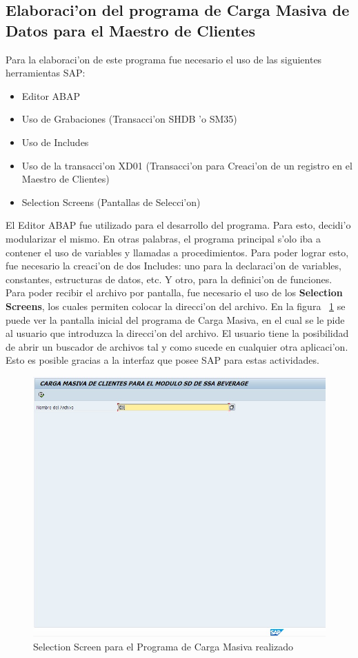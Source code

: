 \subsection{Elaboraci'on del programa de Carga Masiva de Datos para el Maestro de Clientes}
	Para la elaboraci'on de este programa fue necesario el uso de las siguientes herramientas SAP:
\begin{itemize}
\item Editor ABAP
\item Uso de Grabaciones (Transacci'on SHDB 'o SM35)
\item Uso de Includes
\item Uso de la transacci'on XD01 (Transacci'on para Creaci'on de un registro en el Maestro de Clientes)
\item Selection Screens (Pantallas de Selecci'on)
\end{itemize}
	El Editor ABAP fue utilizado para el desarrollo del programa. Para esto, decidi'o modularizar el mismo. En otras palabras, el programa principal s'olo iba a contener el uso de variables y llamadas a procedimientos. 
	Para poder lograr esto, fue necesario la creaci'on de dos Includes: uno para la declaraci'on de variables, constantes, estructuras de datos, etc. Y otro, para la definici'on de funciones.
	Para poder recibir el archivo por pantalla, fue necesario el uso de los \textbf{Selection Screens}, los cuales permiten colocar la direcci'on del archivo. En la figura ~\ref{fig:screen} se puede ver la pantalla inicial del programa de Carga Masiva, en el cual se le pide al usuario que introduzca la direcci'on del archivo. El usuario tiene la posibilidad de abrir un buscador de archivos tal y como sucede en cualquier otra aplicaci'on. Esto es posible gracias a la interfaz que posee SAP para estas actividades.
\begin{figure}[H]
\centering
\includegraphics[scale=0.65,type=jpg,ext=.jpg,read=.jpg]{figures/screen}
\caption{Selection Screen para el Programa de Carga Masiva realizado}
\label{fig:screen}
\end{figure}
